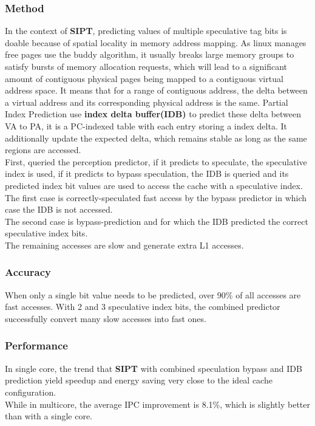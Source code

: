 \documentclass[10pt,a4paper]{article}
\begin{document}
\subsubsection{Method}
In the context of \textbf{SIPT}, predicting values of multiple speculative tag bits is doable because of spatial locality in memory address mapping. As linux manages free pages use the buddy algorithm, it usually breaks large memory groups to satisfy bursts of memory allocation requests, which will lead to a significant amount of contiguous physical pages being mapped to a contiguous virtual address space. It means that for a range of contiguous address, the delta between a virtual address and its corresponding physical address is the same. Partial Index Prediction use \textbf{index delta buffer(IDB)} to predict these delta between VA to PA, it is a PC-indexed table with each entry storing a index delta. It additionally update the expected delta, which remains stable as long as the same regions are accessed.\\
First, queried the perception predictor, if it predicts to speculate, the speculative index is used, if it predicts to bypass speculation, the IDB is queried and its predicted index bit values are used to access the cache with a speculative index.\\
The first case is correctly-speculated fast access by the bypass predictor in which case the IDB is not accessed.\\
The second case is bypass-prediction and for which the IDB predicted the correct speculative index bits.\\
The remaining accesses are slow and generate extra L1 accesses.
\subsubsection{Accuracy}
When only a single bit value needs to be predicted, over 90\% of all accesses are fast accesses. With 2 and 3 speculative index bits, the combined predictor successfully convert many slow accesses into fast ones.
\subsubsection{Performance}
In single core, the trend that \textbf{SIPT} with combined speculation bypass and IDB prediction yield speedup and energy saving very close to the ideal cache configuration.\\
While in multicore, the average IPC improvement is 8.1\%, which is slightly better than with a single core.
\end{document}
